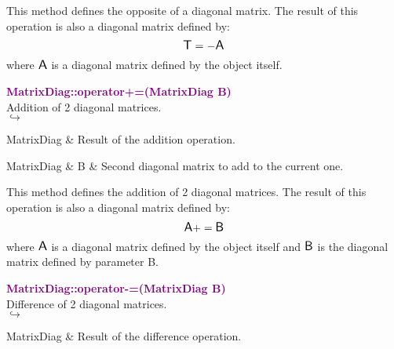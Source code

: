 This method defines the opposite of a diagonal matrix.
The result of this operation is also a diagonal matrix defined by:
\begin{equation*}
\mbox{\large\ensuremath{\mathsf{T}}} = - \mbox{\large\ensuremath{\mathsf{A}}}
\end{equation*}
where $\mbox{\large\ensuremath{\mathsf{A}}}$ is a diagonal matrix defined by the object itself.

\textcolor{purple}{\textbf{MatrixDiag::operator+=(MatrixDiag B)}}\label{MatrixDiag::operator+=(MatrixDiag B)}\\
Addition of 2 diagonal matrices.\\ \hspace*{5mm}$\hookrightarrow$
\vspace*{-2em}\begin{tcolorbox}[grow to left by=-1cm, width=\textwidth-1cm,myArgs,tabularx={l|R}]
MatrixDiag & Result of the addition operation.
\end{tcolorbox}

\begin{tcolorbox}[width=\textwidth,myArgs,tabularx={ll|R}]
MatrixDiag & B & Second diagonal matrix to add to the current one.
\end{tcolorbox}

This method defines the addition of 2 diagonal matrices.
The result of this operation is also a diagonal matrix defined by:
\begin{equation*}
\mbox{\large\ensuremath{\mathsf{A}}} += \mbox{\large\ensuremath{\mathsf{B}}}
\end{equation*}
where $\mbox{\large\ensuremath{\mathsf{A}}}$ is a diagonal matrix defined by the object itself and $\mbox{\large\ensuremath{\mathsf{B}}}$ is the diagonal matrix defined by parameter B.

\textcolor{purple}{\textbf{MatrixDiag::operator-=(MatrixDiag B)}}\label{MatrixDiag::operator-=(MatrixDiag B)}\\
Difference of 2 diagonal matrices.\\ \hspace*{5mm}$\hookrightarrow$
\vspace*{-2em}\begin{tcolorbox}[grow to left by=-1cm, width=\textwidth-1cm,myArgs,tabularx={l|R}]
MatrixDiag & Result of the difference operation.
\end{tcolorbox}

